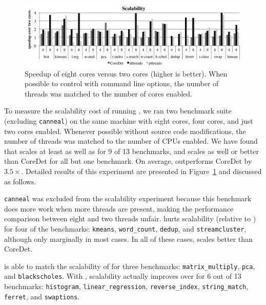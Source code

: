 \label{sec:scalability}

\begin{figure}
{\centering
\includegraphics[width=6in]{dthreads/figure/scalability-figure}
\caption{Speedup of eight cores versus two cores (higher is better).  When possible to control with command line options, the number of threads was matched to the number of cores enabled.\label{fig:scalability}}
}
\end{figure}

To measure the scalability cost of running \dthreads{}, we ran two benchmark suite (excluding \texttt{canneal}) on the same machine with eight cores, four cores, and just two cores enabled.  Whenever possible without source code modifications, the number of threads was matched to the number of CPUs enabled.  We have found that \dthreads{} scales at least as well as \pthreads{} for 9 of 13 benchmarks, and scales as well or better than CoreDet for all but one benchmark. On average, \dthreads{} outperforms CoreDet by $3.5\times$.  Detailed results of this experiment are presented in Figure~\ref{fig:scalability} and discussed as follows.

\texttt{canneal} was excluded from the scalability experiment because this benchmark does more work when more threads are present, making the performance comparison between eight and two threads unfair.  \dthreads{} hurts scalability (relative to \pthreads{}) for four of the benchmarks: \texttt{kmeans}, \texttt{word\_count}, \texttt{dedup}, and \texttt{streamcluster}, although only marginally in most cases.  In all of these cases, \dthreads{} scales better than CoreDet.

\dthreads{} is able to match the scalability of \pthreads{} for three benchmarks: \texttt{matrix\_multiply}, \texttt{pca}, and \texttt{blackscholes}.  With \dthreads{}, scalability actually improves over \pthreads{} for 6 out of 13 benchmarks: \texttt{histogram}, \texttt{linear\_regression}, \texttt{reverse\_index}, \texttt{string\_match}, \texttt{ferret}, and \texttt{swaptions}.

